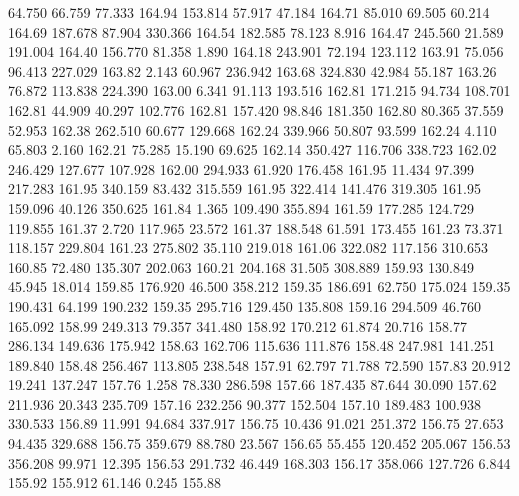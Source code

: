   64.750   66.759   77.333       164.94
 153.814   57.917   47.184       164.71
  85.010   69.505   60.214       164.69
 187.678   87.904  330.366       164.54
 182.585   78.123    8.916       164.47
 245.560   21.589  191.004       164.40
 156.770   81.358    1.890       164.18
 243.901   72.194  123.112       163.91
  75.056   96.413  227.029       163.82
   2.143   60.967  236.942       163.68
 324.830   42.984   55.187       163.26
  76.872  113.838  224.390       163.00
   6.341   91.113  193.516       162.81
 171.215   94.734  108.701       162.81
  44.909   40.297  102.776       162.81
 157.420   98.846  181.350       162.80
  80.365   37.559   52.953       162.38
 262.510   60.677  129.668       162.24
 339.966   50.807   93.599       162.24
   4.110   65.803    2.160       162.21
  75.285   15.190   69.625       162.14
 350.427  116.706  338.723       162.02
 246.429  127.677  107.928       162.00
 294.933   61.920  176.458       161.95
  11.434   97.399  217.283       161.95
 340.159   83.432  315.559       161.95
 322.414  141.476  319.305       161.95
 159.096   40.126  350.625       161.84
   1.365  109.490  355.894       161.59
 177.285  124.729  119.855       161.37
   2.720  117.965   23.572       161.37
 188.548   61.591  173.455       161.23
  73.371  118.157  229.804       161.23
 275.802   35.110  219.018       161.06
 322.082  117.156  310.653       160.85
  72.480  135.307  202.063       160.21
 204.168   31.505  308.889       159.93
 130.849   45.945   18.014       159.85
 176.920   46.500  358.212       159.35
 186.691   62.750  175.024       159.35
 190.431   64.199  190.232       159.35
 295.716  129.450  135.808       159.16
 294.509   46.760  165.092       158.99
 249.313   79.357  341.480       158.92
 170.212   61.874   20.716       158.77
 286.134  149.636  175.942       158.63
 162.706  115.636  111.876       158.48
 247.981  141.251  189.840       158.48
 256.467  113.805  238.548       157.91
  62.797   71.788   72.590       157.83
  20.912   19.241  137.247       157.76
   1.258   78.330  286.598       157.66
 187.435   87.644   30.090       157.62
 211.936   20.343  235.709       157.16
 232.256   90.377  152.504       157.10
 189.483  100.938  330.533       156.89
  11.991   94.684  337.917       156.75
  10.436   91.021  251.372       156.75
  27.653   94.435  329.688       156.75
 359.679   88.780   23.567       156.65
  55.455  120.452  205.067       156.53
 356.208   99.971   12.395       156.53
 291.732   46.449  168.303       156.17
 358.066  127.726    6.844       155.92
 155.912   61.146    0.245       155.88
